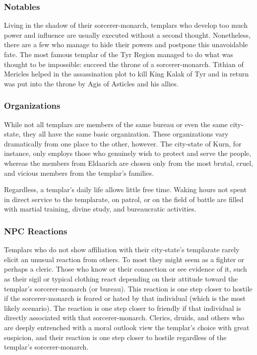 \subsubsection{Notables}
Living in the shadow of their sorcerer-monarch, templars who develop too much power and influence are usually executed without a second thought. Nonetheless, there are a few who manage to hide their powers and postpone this unavoidable fate. The most famous templar of the Tyr Region managed to do what was thought to be impossible: succeed the throne of a sorcerer-monarch. Tithian of Mericles helped in the assassination plot to kill King Kalak of Tyr and in return was put into the throne by Agis of Asticles and his allies.

\subsubsection{Organizations}
While not all templars are members of the same bureau or even the same city-state, they all have the same basic organization. These organizations vary dramatically from one place to the other, however. The city-state of Kurn, for instance, only employs those who genuinely wish to protect and serve the people, whereas the members from Eldaarich are chosen only from the most brutal, cruel, and vicious members from the templar's families.

Regardless, a templar's daily life allows little free time. Waking hours not spent in direct service to the templarate, on patrol, or on the field of battle are filled with martial training, divine study, and bureaucratic
activities.

\subsubsection{NPC Reactions}
Templars who do not show affiliation with their city-state's templarate rarely elicit an unusual reaction from others. To most they might seem as a fighter or perhaps a cleric. Those who know or their connection or see evidence of it, such as their sigil or typical clothing react depending on their attitude toward the templar's sorcerer-monarch (or bureau). This reaction is one step closer to hostile if the sorcerer-monarch is feared or hated by that individual (which is the most likely scenario). The reaction is one step closer to friendly if that individual is directly associated with that sorcerer-monarch. Clerics, druids, and others who are deeply entrenched with a moral outlook view the templar's choice with great suspicion, and their reaction is one step closer to hostile regardless of the templar's sorcerer-monarch.

